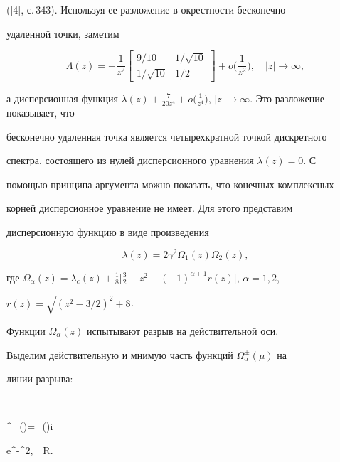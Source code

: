 ([4], с.\,343). Используя ее разложение в окрестности бесконечно 


удаленной точки, заметим 


\begin{equation} 


\Lambda(z)=-\frac{1}{z^2} 


\begin{bmatrix} 


9/10 & 1/\sqrt{10} \\ 1/\sqrt{10} & 1/2 \end{bmatrix} 


+o\bigg(\frac{1}{z^2} \bigg),\quad |z|\to\infty, 


\end{equation} 


а дисперсионная функция $\lambda(z)+\frac{7}{20z^4}+o\big( 


\frac{1}{z^4}\big)$, $|z|\to\infty$. Это разложение показывает, что 


бесконечно удаленная точка является четырехкратной точкой дискретного 


спектра, состоящего из нулей дисперсионного уравнения $\lambda(z)=0$. С 


помощью принципа аргумента можно показать, что конечных комплексных 


корней дисперсионное уравнение не имеет. Для этого представим 


дисперсионную функцию в виде произведения 


\begin{equation}  


\lambda(z)=2\gamma^2\Omega_1(z)\Omega_2(z), 


\end{equation}  


где $\Omega_\alpha(z)=\lambda_c(z)+\frac{1}{8}\big[ 


\frac{3}{2}-z^2+(-1)^{\alpha+1}r(z)\big]$, $\alpha=1,2$, 


$r(z)=\sqrt{(z^2-3/2)^2+8}$. 


Функции $\Omega_\alpha(z)$ испытывают разрыв на действительной оси. 


Выделим действительную и мнимую часть функций $\Omega^\pm_\alpha(\mu)$ на 


линии разрыва: 


$$ 


\Omega^\pm_\alpha(\mu)=\Omega_\alpha(\mu)\pm i\sqrt{\pi} 


\mu e^{-\mu^2},\ \ \mu\in\Bbb R. 


